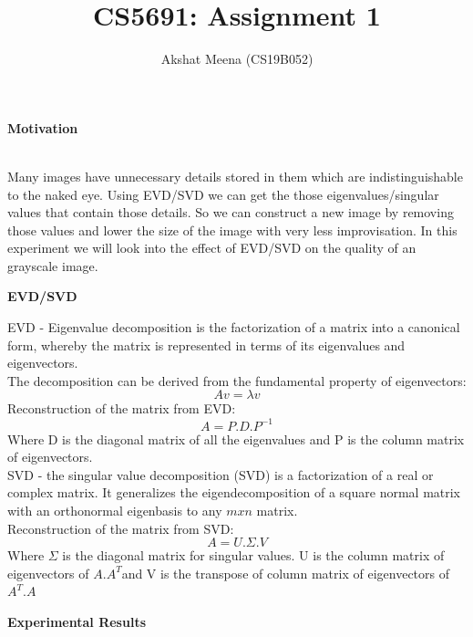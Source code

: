 \documentclass[12pt]{article}
\title{CS5691: Assignment 1}
\author{Akshat Meena (CS19B052)}
\date{}
\begin{document}
\maketitle

\begin{enumerate}
	\\
		Many images have unnecessary details stored in them which are indistinguishable to the naked eye. Using EVD/SVD we can get the those eigenvalues/singular values that contain those details. So we can construct a new image by removing those values and lower the size of the image with very less improvisation. In this experiment we will look into the effect of EVD/SVD on the quality of an grayscale image.\\
EVD - Eigenvalue decomposition is the factorization of a matrix into a canonical form, whereby the matrix is represented in terms of its eigenvalues and eigenvectors.\\
The decomposition can be derived from the fundamental property of eigenvectors: 
$$Av = \lambda v$$
Reconstruction of the matrix from EVD:
$$A = P.D.P^{-1}$$
Where D is the diagonal matrix of all the eigenvalues and P is the column matrix of eigenvectors.\\

SVD - the singular value decomposition (SVD) is a factorization of a real or complex matrix. It generalizes the eigendecomposition of a square normal matrix with an orthonormal eigenbasis to any $m x n$ matrix.\\
Reconstruction of the matrix from SVD:
$$A = U.\Sigma .V$$
Where $\Sigma$ is the diagonal matrix for singular values. U is the column matrix of eigenvectors of $A.A^T$and V is the transpose of column matrix of eigenvectors of $A^T.A$\\
	\\
	

\end{enumerate}
\end{document}
